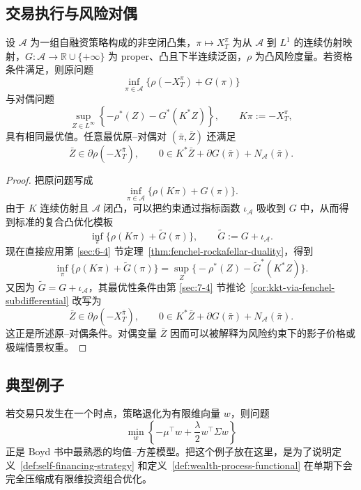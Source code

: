 \subsection{交易执行与风险对偶}

\begin{theorem}[投资组合风险模型的对偶表达]\label{thm:portfolio-risk-duality}
设 $\mathcal A$ 为一组自融资策略构成的非空闭凸集，$\pi\mapsto X_T^\pi$ 为从 $\mathcal A$ 到 $L^1$ 的连续仿射映射，$G\colon \mathcal A\to \mathbb R\cup\{+\infty\}$ 为 proper、凸且下半连续泛函，$\rho$ 为凸风险度量。若资格条件满足，则原问题
\[
\inf_{\pi\in \mathcal A}\{\rho(-X_T^\pi)+G(\pi)\}
\]
与对偶问题
\[
\sup_{Z\in L^\infty}
\left\{
-\rho^\ast(Z)-G^\ast(K^\ast Z)
\right\},
\qquad
K\pi:=-X_T^\pi,
\]
具有相同最优值。任意最优原--对偶对 $(\bar\pi,\bar Z)$ 还满足
\[
\bar Z\in \partial \rho(-X_T^{\bar\pi}),
\qquad
0\in K^\ast \bar Z+\partial G(\bar\pi)+N_{\mathcal A}(\bar\pi).
\]
\end{theorem}

\begin{proof}
把原问题写成
\[
\inf_{\pi\in \mathcal A}\bigl\{\rho(K\pi)+G(\pi)\bigr\}.
\]
由于 $K$ 连续仿射且 $\mathcal A$ 闭凸，可以把约束通过指标函数 $\iota_{\mathcal A}$ 吸收到 $G$ 中，从而得到标准的复合凸优化模板
\[
\inf_{\pi}\bigl\{\rho(K\pi)+\widetilde G(\pi)\bigr\},
\qquad
\widetilde G:=G+\iota_{\mathcal A}.
\]
现在直接应用第 \ref{sec:6-4} 节定理~\ref{thm:fenchel-rockafellar-duality}，得到
\[
\inf_{\pi}\bigl\{\rho(K\pi)+\widetilde G(\pi)\bigr\}
=
\sup_{Z}\bigl\{-\rho^\ast(Z)-\widetilde G^\ast(K^\ast Z)\bigr\}.
\]
又因为 $\widetilde G=G+\iota_{\mathcal A}$，其最优性条件由第 \ref{sec:7-4} 节推论~\ref{cor:kkt-via-fenchel-subdifferential} 改写为
\[
\bar Z\in \partial \rho(-X_T^{\bar\pi}),
\qquad
0\in K^\ast \bar Z+\partial G(\bar\pi)+N_{\mathcal A}(\bar\pi).
\]
这正是所述原--对偶条件。对偶变量 $\bar Z$ 因而可以被解释为风险约束下的影子价格或极端情景权重。
\end{proof}

\subsection{典型例子}

\begin{example}
若交易只发生在一个时点，策略退化为有限维向量 $w$，则问题
\[
\min_w \left\{-\mu^\top w+\frac{\lambda}{2}w^\top \Sigma w\right\}
\]
正是 Boyd 书中最熟悉的均值--方差模型。把这个例子放在这里，是为了说明定义~\ref{def:self-financing-strategy} 和定义~\ref{def:wealth-process-functional} 在单期下会完全压缩成有限维投资组合优化。
\end{example}

